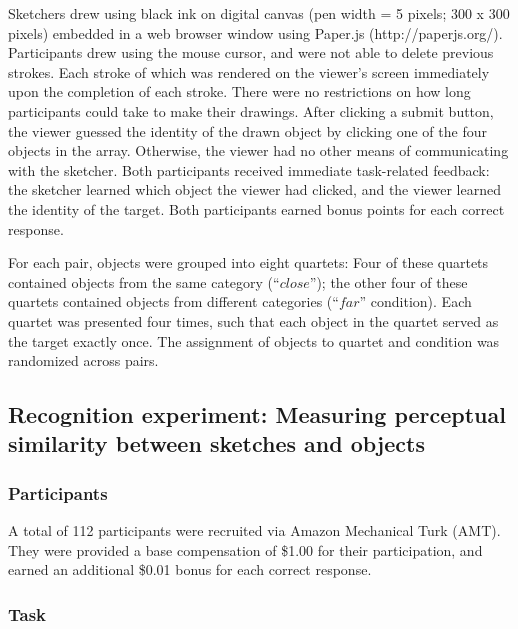 \documentclass[9pt,twocolumn,twoside]{pnas-new}
\begin{document}
{Sketchers drew using black ink on digital canvas (pen width = 5 pixels; 300 x 300 pixels) embedded in a web browser window using Paper.js (http://paperjs.org/). Participants drew using the mouse cursor, and were not able to delete previous strokes. Each stroke of which was rendered on the viewer's screen immediately upon the completion of each stroke. There were no restrictions on how long participants could take to make their drawings. After clicking a submit button, the viewer guessed the identity of the drawn object by clicking one of the four objects in the array. Otherwise, the viewer had no other means of communicating with the sketcher. Both participants received immediate task-related feedback: the sketcher learned which object the viewer had clicked, and the viewer learned the identity of the target. Both participants earned bonus points for each correct response.

For each pair, objects were grouped into eight quartets: Four of these quartets contained objects from the same category (``$close$''); the other four of these quartets contained objects from different categories (``$far$'' condition). Each quartet was presented four times, such that each object in the quartet served as the target exactly once. The assignment of objects to quartet and condition was randomized across pairs.

\subsection*{Recognition experiment: Measuring perceptual similarity between sketches and objects}

\subsubsection*{Participants}

A total of 112 participants were recruited via Amazon Mechanical Turk (AMT). They were provided a base compensation of \$1.00 for their participation, and earned an additional \$0.01 bonus for each correct response.

\subsubsection*{Task}

}
\end{document}

